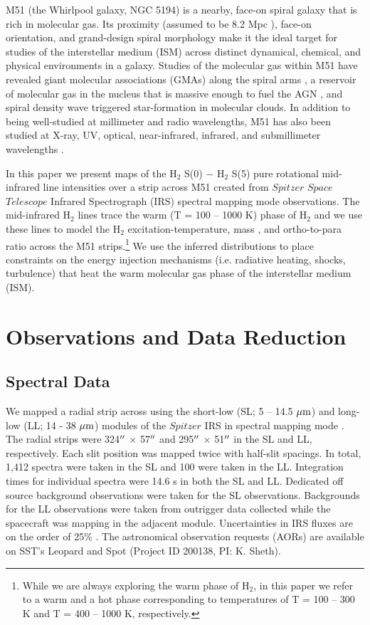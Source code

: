 \documentclass[manuscript]{aastex}
\begin{document}
M51 (the Whirlpool galaxy, NGC 5194) is a nearby,
face-on spiral galaxy that is rich in molecular gas.  Its proximity
(assumed to be 8.2 Mpc \citep{tul88}), face-on orientation, and
grand-design spiral morphology make it the ideal target for
studies of the interstellar medium (ISM) across distinct dynamical,
chemical, and physical environments in a galaxy.  Studies of the
molecular gas within M51 have revealed giant molecular associations
(GMAs) along the spiral arms \citep{vog88,ran90,aal99}, a reservoir 
of molecular gas in the nucleus that is massive enough 
to fuel the AGN \citep{sco98}, and spiral density wave 
triggered star-formation in molecular clouds\citep{vog88}.
In addition to being well-studied at millimeter and radio wavelengths,
M51 has also been studied at X-ray, UV, optical, near-infrared,
infrared, and submillimeter wavelengths \citep{pal85,wil01, sco01,
  cal05, mat04}.  
  
In this paper we present maps of the  
$\mathrm{H_2}$ S(0) $-$ $\mathrm{H_2}$ S(5) pure rotational 
mid-infrared line intensities over a strip across M51 
created from $Spitzer$ $Space$ $Telescope$ 
Infrared Spectrograph (IRS) spectral mapping mode observations.
The mid-infrared H$_2$ lines trace the warm (T = 100 -- 1000 K) phase 
of H$_2$ and we use these lines to model the $\mathrm{H_2}$ 
 excitation-temperature, mass \citep{rig02, hig06}, and ortho-to-para ratio 
 \citep{neu98, neu06} across the M51 strips.\footnote{While we 
 are always exploring the warm phase of H$_2$, in this paper 
 we refer to a warm and a hot phase corresponding to 
 temperatures of T = 100 -- 300 K and T = 400 -- 1000 K, 
 respectively.}  We use the inferred distributions to  place constraints 
 on the energy injection mechanisms (i.e. radiative heating, 
 shocks, turbulence) that heat the warm molecular gas 
 phase of the interstellar medium (ISM).

\section{Observations and Data Reduction}

\subsection{Spectral Data}

We mapped a radial strip across  using the short-low
(SL; 5 -- 14.5 $\mbox{$\mu$m}$) and long-low (LL; 14 - 38 $\mbox{$\mu$m}$) 
modules of the $Spitzer$ IRS in spectral
mapping mode \citep{hou04}.  The radial strips were 324$\mbox{$^{\prime\prime}$}$ $\times$
57$\mbox{$^{\prime\prime}$}$ and 295$\mbox{$^{\prime\prime}$}$ $\times$ 51$\mbox{$^{\prime\prime}$}$ in the SL and LL,
respectively.  Each slit position was mapped twice with half-slit spacings.  In
total, 1,412 spectra were taken in the SL and 100 were taken in the LL.  
Integration times for individual 
spectra were 14.6 s in both the SL and LL.  Dedicated off source 
background observations were taken for the SL observations.  Backgrounds for the
LL observations were taken from outrigger data collected while the
spacecraft was mapping in the adjacent module.  Uncertainties in 
IRS fluxes are on the order of 25\% \citep{smi04}.  The astronomical
observation requests (AORs) are available on SST's Leopard and Spot
(Project ID 200138, PI: K. Sheth).
\end{document}
